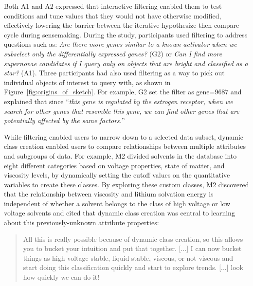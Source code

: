 \par Both A1 and A2 expressed that 
interactive filtering enabled 
them to test conditions and tune values 
that they would not have otherwise modified, 
effectively lowering the barrier between 
the iterative hypothesize-then-compare cycle during sensemaking.
During the study, participants used filtering 
to address questions such as: 
\textit{Are there more genes similar 
to a known activator when we subselect 
only the differentially expressed genes?} (G2) or \textit{Can I find more supernovae candidates if I query only on objects that are bright and classified as a star?} (A1). Three participants had also used filtering as a way to pick out individual objects of interest to query with, as shown in Figure~\ref{fig:origins_of_sketch}. For example, G2 set the filter as gene=9687 and explained that since ``\textit{this gene is regulated by the estrogen receptor, when we search for other genes that resemble this gene, we can find other genes that are potentially affected by the same factors.}''
\par While filtering enabled users to 
narrow down to a selected data subset, 
dynamic class creation enabled users to compare 
relationships between multiple attributes and subgroups of data. 
For example, M2 divided solvents in the database 
into eight different categories based on voltage properties, 
state of matter, and viscosity levels, 
by dynamically setting the cutoff values 
on the quantitative variables to create these classes. 
By exploring these custom classes, M2 discovered that the relationship between viscosity and lithium solvation energy is independent of whether a solvent belongs to the class of high voltage or low voltage solvents and cited that dynamic class creation was central to learning about this previously-unknown attribute properties:
\begin{quote}
All this is really possible because of dynamic class creation, so this allows you to bucket your intuition and put that together. [...] I can now bucket things as high voltage stable, liquid stable, viscous, or not viscous and start doing this classification quickly and start to explore trends. [...] look how quickly we can do it!%
\end{quote}
